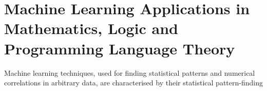 \section{Machine Learning Applications in Mathematics, Logic and Programming
  Language Theory}

Machine learning techniques, used for finding statistical patterns and numerical
correlations in arbitrary data, are characterised by their statistical
pattern-finding



